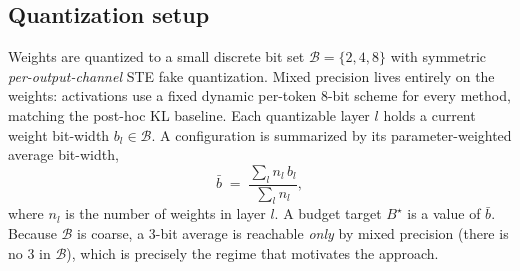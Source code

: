 \documentclass[conference]{IEEEtran}
\begin{document}
\subsection{Quantization setup}
Weights are quantized to a small discrete bit set \(\mathcal{B}=\{2,4,8\}\) with
symmetric \emph{per-output-channel} STE fake quantization. Mixed precision lives
entirely on the weights: activations use a fixed dynamic per-token 8-bit scheme
for every method, matching the post-hoc KL baseline. Each quantizable layer \(l\)
holds a current weight bit-width
\(b_l \in \mathcal{B}\). A configuration is summarized by its parameter-weighted
average bit-width,
\begin{equation}
\bar{b} \;=\; \frac{\sum_l n_l\, b_l}{\sum_l n_l},
\label{eq:avgbits}
\end{equation}
where \(n_l\) is the number of weights in layer \(l\). A budget target
\(B^\star\) is a value of \(\bar{b}\). Because \(\mathcal{B}\) is coarse, a 3-bit
average is reachable \emph{only} by mixed precision (there is no 3 in
\(\mathcal{B}\)), which is precisely the regime that motivates the approach.
\end{document}
